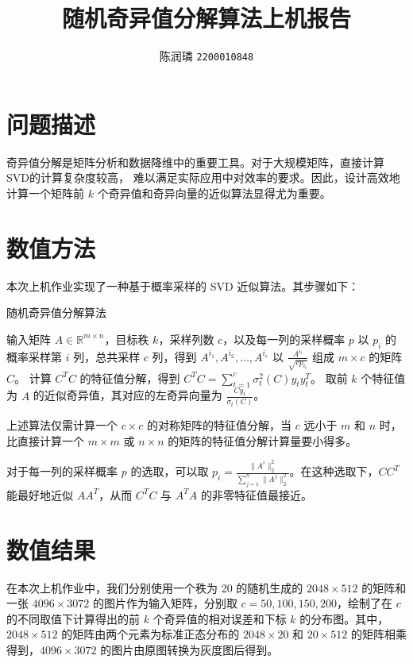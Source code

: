 \documentclass{article}
\title{随机奇异值分解算法上机报告}
\author{陈润璘 \texttt{2200010848}}
\begin{document}
\maketitle

\section{问题描述}

奇异值分解是矩阵分析和数据降维中的重要工具。对于大规模矩阵，直接计算SVD的计算复杂度较高，
难以满足实际应用中对效率的要求。因此，设计高效地计算一个矩阵前 $k$ 个奇异值和奇异向量的近似算法显得尤为重要。

\section{数值方法}

本次上机作业实现了一种基于概率采样的 SVD 近似算法。其步骤如下：

\begin{algorithm}
    \caption{随机奇异值分解算法}
    \begin{algorithmic}[1]
        \State 输入矩阵 $A \in \mathbb{R}^{m \times n}$，目标秩 $k$，采样列数
        $c$，以及每一列的采样概率 $p$
        \State 以 $p_i$ 的概率采样第 $i$ 列，总共采样 $c$ 列，得到 $A^{i_1},
        A^{i_2},\dots,A^{i_c}$
        \State 以 $\frac{A^{i_t}}{\sqrt{cp_{i_t}}}$ 组成 $m\times c$ 的矩阵 $C$。
        \State 计算 $C^T C$ 的特征值分解，得到 $C^T C =
        \sum_{t=1}^{c}\sigma_t^2(C)y_t y_t^T$。
        \State 取前 $k$ 个特征值为 $A$ 的近似奇异值，其对应的左奇异向量为 $\frac{Cy_t}{\sigma_t(C)}$。
    \end{algorithmic}
    \label{alg:svd}
\end{algorithm}

上述算法仅需计算一个 $c\times c$ 的对称矩阵的特征值分解，当 $c$ 远小于 $m$ 和 $n$ 时，比直接计算一个
$m\times m$ 或 $n\times n$ 的矩阵的特征值分解计算量要小得多。

对于每一列的采样概率 $p$ 的选取，可以取 $p_i =
\frac{\|A^i\|_2^2}{\sum_{j=1}^{n}\|A^j\|_2^2}$。在这种选取下，$C C^T$ 能最好地近似
$A A^T$，从而 $C^T C$ 与 $A^T A$ 的非零特征值最接近。

\section{数值结果}

在本次上机作业中，我们分别使用一个秩为 20 的随机生成的 $2048\times 512$ 的矩阵和一张 $4096\times
3072$ 的图片作为输入矩阵，分别取 $c = 50, 100, 150, 200$，绘制了在 $c$ 的不同取值下计算得出的前 $k$
个奇异值的相对误差和下标 $k$ 的分布图。其中，$2048\times 512$ 的矩阵由两个元素为标准正态分布的
$2048\times 20$ 和 $20\times 512$ 的矩阵相乘得到，$4096\times 3072$ 的图片由原图转换为灰度图后得到。
\end{document}
